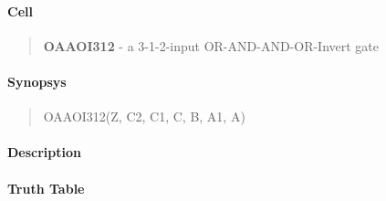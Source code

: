 \label{OAAOI312}
\paragraph{Cell}
\begin{quote}
    \textbf{OAAOI312} - a 3-1-2-input OR-AND-AND-OR-Invert gate
\end{quote}

\paragraph{Synopsys}
\begin{quote}
    OAAOI312(Z, C2, C1, C, B, A1, A)
\end{quote}

\paragraph{Description}

%

\paragraph{Truth Table}
%

